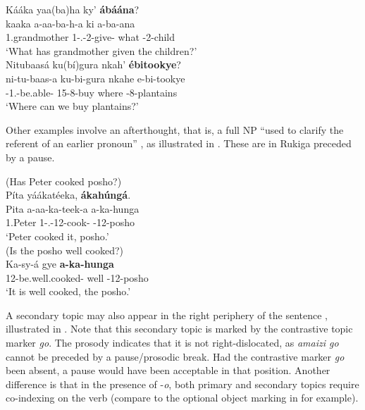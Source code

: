\documentclass[output=paper]{langscibook}
\begin{document}
\ea
\label{bkm:Ref111462821}
Kááka yaa(ba)ha ky’ \textbf{ábáána}?\\
\gll
kaaka  a-aa-ba-h-a  ki  a-ba-ana\\
1.grandmother  1\SM{}-\N{}.\PST{}-2\OM{}-give-\FV{}  what  \AUG{}-2-child\\
\glt
‘What has grandmother given the children?’\\

\ex
\label{bkm:Ref113457070}
Nitubaasá ku(bí)gura nkah’ \textbf{ébitookye}?\\
\gll
ni-tu-baas-a  ku-bi-gura  nkahe  e-bi-tookye\\
\IPFV{}-1\PL{}.\SM{}-be.able-\FV{}  15-8\OM{}-buy  where  \AUG{}-8-plantains\\
\glt
‘Where can we buy plantains?’\\

\z


Other examples involve an afterthought, that is, a full NP “used to clarify the referent of an earlier pronoun” \citep[414]{Lopez2016}, as illustrated in . These are in Rukiga preceded by a pause.

\ea
\label{bkm:Ref113460217}
\ea
(Has Peter cooked posho?)\\
Píta yáákatéeka, \textbf{ákahúngá}.\\
\gll
Pita  a-aa-ka-teek-a  a-ka-hunga\\
1.Peter  1\SM{}-\N{}.\PST{}-12\OM{}-cook-\FV{}  \AUG{}-12-{}posho\\
\glt
‘Peter cooked it, posho.’\\

\ex
(Is the posho well cooked?)\\
\gll
Ka-sy-á  gye  \textbf{a-ka-hunga}\\
12\SM{}-be.well.cooked-\FV{}  well \AUG{}-12-posho\\
\glt
‘It is well cooked, the posho.’\\

\z
\z

A secondary topic may also appear in the right periphery of the sentence \citep{AsiimwevanderWal2021}, illustrated in . Note that this secondary topic is marked by the contrastive topic marker \textit{go}. The prosody indicates that it is not right-dislocated, as \textit{amaizi go} cannot be preceded by a pause/prosodic break. Had the contrastive marker \textit{go} been absent, a pause would have been acceptable in that position. Another difference is that in the presence of -\textit{o}, both primary and secondary topics require co-indexing on the verb (compare to the optional object marking in  for example).
\end{document}
